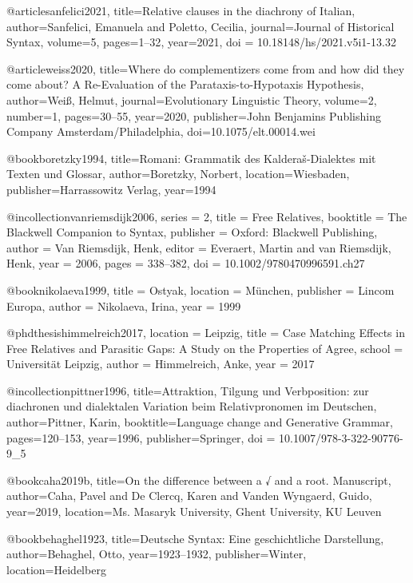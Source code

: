 @article{sanfelici2021,
  title={Relative clauses in the diachrony of Italian},
  author={Sanfelici, Emanuela and Poletto, Cecilia},
  journal={Journal of Historical Syntax},
  volume={5},
  pages={1--32},
  year={2021},
  doi = {10.18148/hs/2021.v5i1-13.32}
}

@article{weiss2020,
  title={Where do complementizers come from and how did they come about? A Re-Evaluation of the Parataxis-to-Hypotaxis Hypothesis},
  author={Weiß, Helmut},
  journal={Evolutionary Linguistic Theory},
  volume={2},
  number={1},
  pages={30--55},
  year={2020},
  publisher={John Benjamins Publishing Company Amsterdam/Philadelphia},
  doi={10.1075/elt.00014.wei}
}

@book{boretzky1994,
  title={Romani: Grammatik des Kalderaš-Dialektes mit Texten und Glossar},
  author={Boretzky, Norbert},
  location={Wiesbaden},
  publisher={Harrassowitz Verlag},
  year={1994}
}

@incollection{vanriemsdijk2006,
  series = {2},
  title = {Free Relatives},
  booktitle = {The {{Blackwell Companion}} to Syntax},
  publisher = {{Oxford: Blackwell Publishing}},
  author = {Van Riemsdijk, Henk},
  editor = {Everaert, Martin and {van Riemsdijk}, Henk},
  year = {2006},
  pages = {338--382},
  doi = {10.1002/9780470996591.ch27}
}

@book{nikolaeva1999,
  title = {Ostyak},
  location = {München},
  publisher = {Lincom Europa},
  author = {Nikolaeva, Irina},
  year = {1999}
}


@phdthesis{himmelreich2017,
  location = {Leipzig},
  title = {Case Matching Effects in Free Relatives and Parasitic Gaps: {{A}} Study on the Properties of Agree},
  school = {Universität Leipzig},
  author = {Himmelreich, Anke},
  year = {2017}
}

@incollection{pittner1996,
  title={Attraktion, Tilgung und Verbposition: zur diachronen und dialektalen Variation beim Relativpronomen im Deutschen},
  author={Pittner, Karin},
  booktitle={Language change and Generative Grammar},
  pages={120--153},
  year={1996},
  publisher={Springer},
  doi = {10.1007/978-3-322-90776-9_5}
}



@book{caha2019b,
  title={On the difference between a √ and a root. Manuscript},
  author={Caha, Pavel and De Clercq, Karen and Vanden Wyngaerd, Guido},
  year={2019},
  location={Ms. Masaryk University, Ghent University, KU Leuven}
}


@book{behaghel1923,
  title={Deutsche Syntax: Eine geschichtliche Darstellung},
  author={Behaghel, Otto},
  year={1923--1932},
  publisher={Winter},
  location={Heidelberg}
}


